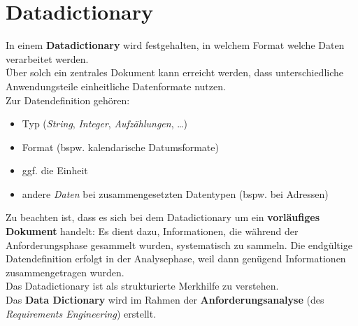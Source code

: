 \section{Datadictionary}

\begin{tcolorbox}[title=Dataditctionary]
    In einem \textbf{Datadictionary} wird festgehalten, in welchem Format welche Daten verarbeitet werden.\\
    Über solch ein zentrales Dokument kann erreicht werden, dass unterschiedliche Anwendungsteile einheitliche Datenformate nutzen.\\

    \noindent
    Zur Datendefinition gehören:
    \begin{itemize}
        \item Typ (\textit{String}, \textit{Integer}, \textit{Aufzählungen}, \ldots)
        \item Format (bspw. kalendarische Datumsformate)
        \item ggf. die Einheit
        \item andere \textit{Daten} bei zusammengesetzten Datentypen (bspw. bei Adressen)
    \end{itemize}

    \noindent
    Zu beachten ist, dass es sich bei dem Datadictionary um ein \textbf{vorläufiges Dokument} handelt: Es dient dazu, Informationen, die während der Anforderungsphase gesammelt wurden, systematisch zu sammeln. Die endgültige Datendefinition erfolgt in der Analysephase, weil dann genügend Informationen zusammengetragen wurden.    \\
    Das Datadictionary ist als strukturierte Merkhilfe zu verstehen.\\

    \noindent
    Das \textbf{Data Dictionary} wird im Rahmen der \textbf{Anforderungsanalyse} (des \textit{Requirements Engineering}) erstellt.
\end{tcolorbox}
